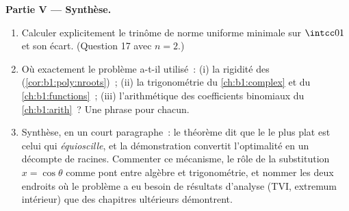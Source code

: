 \begin{problem}
\medskip
\noindent\textbf{Partie V --- Synthèse.}
\begin{enumerate}[resume]
  \item Calculer explicitement le trinôme  de norme uniforme
        minimale sur $\intcc01$ et son écart. (Question 17 avec $n =
        2$.)
  \item Où exactement le problème a-t-il utilisé~: (i) la rigidité
        des  (\cref{cor:b1:poly:nroots})~; (ii) la
        trigonométrie du \cref{ch:b1:complex} et du
        \cref{ch:b1:functions}~; (iii) l'arithmétique des
        coefficients binomiaux du \cref{ch:b1:arith}~? Une phrase
        pour chacun.
  \item Synthèse, en un court paragraphe~: le théorème dit que le
         le plus plat est celui qui
        \emph{équioscille}, et la démonstration convertit
        l'optimalité en un décompte de racines. Commenter ce
        mécanisme, le rôle de la substitution $x = \cos\theta$ comme
        pont entre algèbre et trigonométrie, et nommer les deux
        endroits où le problème a eu besoin de résultats d'analyse
        (TVI, extremum intérieur) que des chapitres ultérieurs
        démontrent.
\end{enumerate}
\end{problem}
